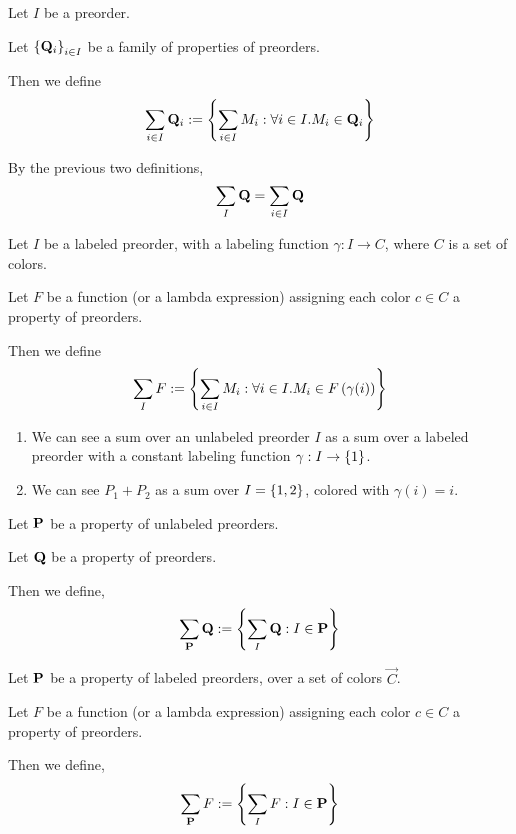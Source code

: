 \begin{definition}
  Let $I$ be a preorder.

  Let $\left\{ {\mathbf{Q}_i} \right\}_{i \in I}$ be a family of properties of preorders.

  Then we define
  \[
    \sum_{i \in I}{\mathbf{Q}_i} := \left\{ {\sum_{i \in I}{M_i} : \forall i \in I. M_i \in \mathbf{Q}_i} \right\}
  \]
\end{definition}

\begin{note}
  By the previous two definitions,
  \[
    \sum_{I}{\mathbf{Q}} = \sum_{i \in I}{\mathbf{Q}}
  \]
\end{note}

\begin{definition}
  Let $I$ be a labeled preorder, with a labeling function $\gamma : I \to C$,
  where $C$ is a set of colors.

  Let $F$ be a function (or a lambda expression) assigning each color
  $c \in C$ a property of preorders.

  Then we define
  \[
    \sum_{I}{F} := \left\{ {\sum_{i \in I}{M_i} : \forall i \in I. M_i \in F \left( {\gamma(i)} \right)} \right\}
  \]
\end{definition}

\begin{notes}
  \begin{enumerate}
    \item We can see a sum over an unlabeled preorder $I$ as a sum over a labeled preorder
          with a constant labeling function $\gamma : I \to \left\{ {1} \right\}$.
    \item We can see $P_1 + P_2$ as a sum over $I = \left\{ {1, 2} \right\}$, colored
          with $\gamma(i) = i$.
  \end{enumerate}
\end{notes}

\begin{definition}
  Let $\mathbf{P}$ be a property of unlabeled preorders.

  Let $\mathbf{Q}$ be a property of preorders.

  Then we define,
  \[
    \sum_{\mathbf{P}}{\mathbf{Q}} := \left\{ {\sum_{I}{\mathbf{Q}} : I \in \mathbf{P}} \right\}
  \]
\end{definition}

\begin{definition}
  Let $\mathbf{P}$ be a property of labeled preorders, over a set of colors $\vec{C}$.

  Let $F$ be a function (or a lambda expression) assigning each color
  $c \in C$ a property of preorders.

  Then we define,
  \[
    \sum_{\mathbf{P}}{F} := \left\{ {\sum_{I}{F} : I \in \mathbf{P}} \right\}
  \]
\end{definition}